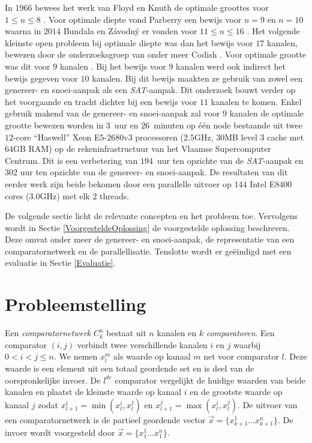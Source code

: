 \documentclass{article}
\begin{document}
In 1966 bewees het werk van Floyd en Knuth de optimale groottes voor $1 \leq n \leq 8$ \cite{FloydKnuth}.
Voor optimale diepte vond Parberry een bewijs voor $n = 9$ en $n = 10$ waarna in $2014$ Bundala en Z\'avodn\'y er vonden voor $11 \leq n \leq 16$ \cite{Parberry,BundalaZavodny}.
Het volgende kleinste open probleem bij optimale diepte was dan het bewijs voor $17$ kanalen, bewezen door de onderzoeksgroep van onder meer Codish \cite{CodishBackAgain}.
Voor optimale grootte was dit voor $9$ kanalen \cite{sortingNetworksSize2014}.
Bij het bewijs voor $9$ kanalen werd ook indirect het bewijs gegeven voor $10$ kanalen. 
Bij dit bewijs maakten ze gebruik van zowel een genereer- en snoei-aanpak als een \textit{SAT}-aanpak.
Dit onderzoek bouwt verder op het voorgaande en tracht dichter bij een bewijs voor $11$ kanalen te komen.
Enkel gebruik makend van de genereer- en snoei-aanpak zal voor $9$ kanalen de optimale grootte bewezen worden in $3$~uur en $26$~minuten op \'e\'en node bestaande uit twee $12$-core ``Haswell'' Xeon E$5$-$2680$v$3$ processoren ($2.5$GHz, $30$MB level $3$ cache met $64$GB RAM) op de rekeninfrastructuur van het Vlaamse Supercomputer Centrum.
Dit is een verbetering van $194$~uur ten opzichte van de \textit{SAT}-aanpak en $302$ uur ten opzichte van de genereer- en snoei-aanpak.
De resultaten van dit eerder werk zijn beide bekomen door een parallelle uitvoer op $144$ Intel E$8400$ cores ($3.0$GHz) met elk $2$ threads.

De volgende sectie licht de relevante concepten en het probleem toe.
Vervolgens wordt in Sectie \ref{VoorgesteldeOplossing} de voorgestelde oplossing beschreven.
Deze omvat onder meer de genereer- en snoei-aanpak, de representatie van een comparatornetwerk en de parallellisatie.
Tenslotte wordt er ge\"eindigd met een evaluatie in Sectie \ref{Evaluatie}.

\section{Probleemstelling}
Een \textit{comparatornetwerk} $C^n_k$ bestaat uit $n$ kanalen en $k$ \textit{comparatoren}.
Een comparator $\left(i, j\right)$ verbindt twee verschillende kanalen $i$ en $j$ waarbij $0 < i < j \leq n$.
We nemen $x_l^m$ als waarde op kanaal $m$ net voor comparator $l$.
Deze waarde is een element uit een totaal geordende set en is deel van de oorspronkelijke invoer. 
De $l^{de}$ comparator  vergelijkt de huidige waarden van beide kanalen en plaatst de kleinste waarde op kanaal $i$ en de grootste waarde op kanaal $j$ zodat $x_{l+1}^i = \min(x_l^i,x_l^j)$ en $x_{l+1}^j = \max(x_l^i,x_l^j)$.
De uitvoer van een comparatornetwerk is de partieel geordende vector $\vec{x} = \{x^1_{k+1} \dots x^n_{k+1} \} $.
De invoer wordt voorgesteld door $\vec{x} = \{x^1_{1} \dots x^n_{1} \} $. 
\end{document}
